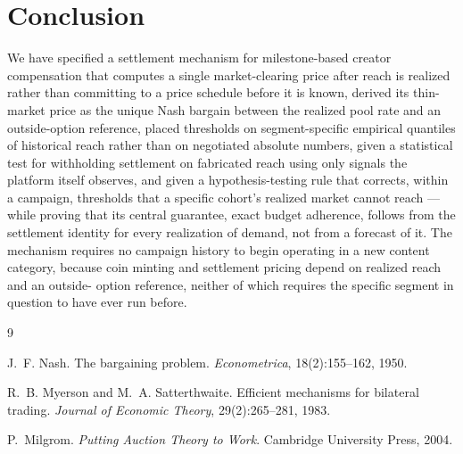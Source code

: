 \documentclass[11pt]{article}
\begin{document}
\section{Conclusion}

We have specified a settlement mechanism for milestone-based creator compensation that computes a
single market-clearing price after reach is realized rather than committing to a price schedule
before it is known, derived its thin-market price as the unique Nash bargain between the realized
pool rate and an outside-option reference, placed thresholds on segment-specific empirical
quantiles of historical reach rather than on negotiated absolute numbers, given a statistical test
for withholding settlement on fabricated reach using only signals the platform itself observes, and
given a hypothesis-testing rule that corrects, within a campaign, thresholds that a specific
cohort's realized market cannot reach — while proving that its central guarantee, exact budget
adherence, follows from the settlement identity for every realization of demand, not from a
forecast of it. The mechanism requires no campaign history to begin operating in a new content
category, because coin minting and settlement pricing depend on realized reach and an outside-
option reference, neither of which requires the specific segment in question to have ever run
before.


\begin{thebibliography}{9}

J.~F. Nash.
\newblock The bargaining problem.
\newblock \emph{Econometrica}, 18(2):155--162, 1950.

R.~B. Myerson and M.~A. Satterthwaite.
\newblock Efficient mechanisms for bilateral trading.
\newblock \emph{Journal of Economic Theory}, 29(2):265--281, 1983.

P.~Milgrom.
\newblock \emph{Putting Auction Theory to Work}.
\newblock Cambridge University Press, 2004.

\end{thebibliography}
\end{document}
